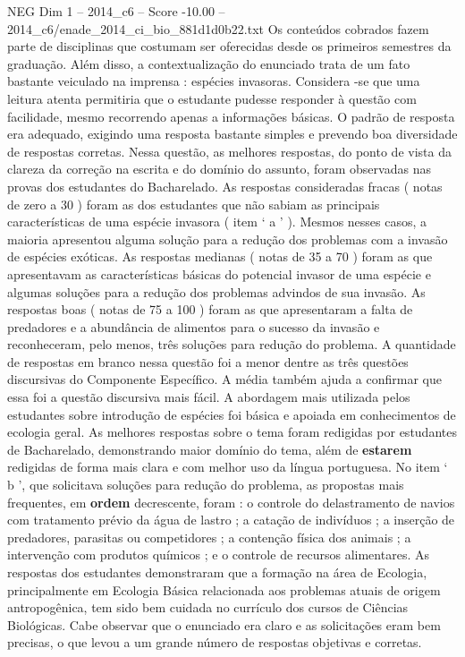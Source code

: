 \begin{textsample}{NEG Dim 1 – 2014\_c6 – Score -10.00 – 2014\_c6/enade\_2014\_ci\_bio\_881d1d0b22.txt}
Os conteúdos cobrados fazem parte de disciplinas que costumam ser oferecidas desde os primeiros semestres da graduação.
Além disso, a contextualização do enunciado trata de um fato bastante veiculado na imprensa : espécies invasoras.
Considera -se que uma leitura atenta permitiria que o estudante pudesse responder à questão com facilidade, mesmo recorrendo apenas a informações básicas.
O padrão de resposta era adequado, exigindo uma resposta bastante simples e prevendo boa diversidade de respostas corretas.
Nessa questão, as melhores respostas, do ponto de vista da clareza da correção na escrita e do domínio do assunto, foram observadas nas provas dos estudantes do Bacharelado.
As respostas consideradas fracas ( notas de zero a 30 ) foram as dos estudantes que não sabiam as principais características de uma espécie invasora ( item ‘ a ’ ).
Mesmos nesses casos, a maioria apresentou alguma solução para a redução dos problemas com a invasão de espécies exóticas.
As respostas medianas ( notas de 35 a 70 ) foram as que apresentavam as características básicas do potencial invasor de uma espécie e algumas soluções para a redução dos problemas advindos de sua invasão.
As respostas boas ( notas de 75 a 100 ) foram as que apresentaram a falta de predadores e a abundância de alimentos para o sucesso da invasão e reconheceram, pelo menos, três soluções para redução do problema.
A quantidade de respostas em branco nessa questão foi a menor dentre as três questões discursivas do Componente Específico.
A média também ajuda a confirmar que essa foi a questão discursiva mais fácil.
A abordagem mais utilizada pelos estudantes sobre introdução de espécies foi básica e apoiada em conhecimentos de ecologia geral.
As melhores respostas sobre o tema foram redigidas por estudantes de Bacharelado, demonstrando maior domínio do tema, além de \textbf{estarem} redigidas de forma mais clara e com melhor uso da língua portuguesa.
No item ‘ b ’, que solicitava soluções para redução do problema, as propostas mais frequentes, em \textbf{ordem} decrescente, foram : o controle do delastramento de navios com tratamento prévio da água de lastro ; a catação de indivíduos ; a inserção de predadores, parasitas ou competidores ; a contenção física dos animais ; a intervenção com produtos químicos ; e o controle de recursos alimentares.
As respostas dos estudantes demonstraram que a formação na área de Ecologia, principalmente em Ecologia Básica relacionada aos problemas atuais de origem antropogênica, tem sido bem cuidada no currículo dos cursos de Ciências Biológicas.
Cabe observar que o enunciado era claro e as solicitações eram bem precisas, o que levou a um grande número de respostas objetivas e corretas.

\end{textsample}
